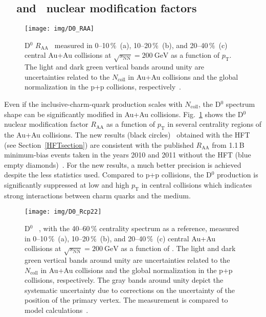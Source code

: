 \subsection{\dzero\ \Raa\ and \Rcp\ nuclear modification factors}
\begin{figure}[!htb]
\begin{center}
 \texttt{[image: img/D0\_RAA]}\\
\end{center}
\caption[D$^0$ $R_\mathrm{AA}$ measured in 0--10$\,\%$, 10--20$\,\%$, and 20--40$\,\%$ central Au+Au collisions.]{\label{dzeroRAA}D$^0$ $R_\mathrm{AA}$~\cite{D0paper} measured in 0--10$\,\%$~(a), 10--20$\,\%$~(b), and 20--40$\,\%$~(c) central Au+Au collisions at $\sqrt{s_\mathrm{NN}} = \SI{200}{\giga\electronvolt}$ as a function of $p_\mathrm{T}$\@. The
light and dark green vertical bands around unity are uncertainties related
to the $N_\mathrm{coll}$ in Au+Au collisions and the global normalization in the p+p collisions,
respectively~\cite{AuAuD0}.}
\end{figure}
Even if the inclusive-charm-quark production scales with $N_\mathrm{coll}$,
the D$^0$ spectrum shape can be significantly modified in Au+Au collisions. Fig.~\ref{dzeroRAA}
shows the D$^0$ nuclear modification factor
$R_\mathrm{AA}$
as a function of $p_\mathrm{T}$ in several centrality regions of the Au+Au collisions.
The new results
(black circles)~\cite{D0paper} obtained with the HFT (see Section~\ref{HFTsection}) are consistent with the published
$R_\mathrm{AA}$ from 1.1$\,$B minimum-bias events taken in the years 2010 and 2011 
without the HFT (blue empty diamonds)~\cite{AuAuD0}\@.
For the new results, a much better precision is achieved despite the less statistics used. 
Compared to p+p collisions, the D$^0$ production is significantly suppressed at low and high $p_\mathrm{T}$ in central collisions which indicates
strong interactions between charm quarks and the medium.

\begin{figure}[!htb]
\begin{center}
 \texttt{[image: img/D0\_Rcp22]}\\
\end{center}
\caption[D$^0$ \Rcp.]{\label{dzeroRcp}D$^0$ \Rcp~\cite{D0paper}, with the 40--60$\,\%$ centrality spectrum as a reference, measured in 0--10$\,\%$~(a), 10--20$\,\%$~(b), and 20--40$\,\%$~(c) central Au+Au collisions at $\sqrt{s_\mathrm{NN}} = \SI{200}{\giga\electronvolt}$ as a function of \pt\@. The
light and dark green vertical bands around unity are uncertainties related
to the $N_\mathrm{coll}$ in Au+Au collisions and the global normalization in the p+p collisions,
respectively. The gray bands around unity depict the systematic uncertainty due to corrections on the uncertainty of the position of the primary vertex. The measurement is compared to model calculations~\cite{Duke, Duke2015, LBT, LBTprivate}.}
\end{figure}


